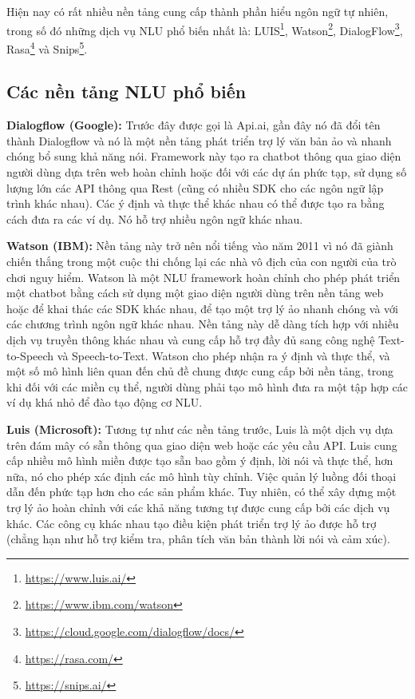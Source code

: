 Hiện nay có rất nhiều nền tảng cung cấp thành phần hiểu ngôn ngữ tự nhiên, trong số đó những dịch vụ NLU phổ biến nhất là: LUIS\footnote{\url{https://www.luis.ai/}}, Watson\footnote{\url{https://www.ibm.com/watson}}, DialogFlow\footnote{\url{https://cloud.google.com/dialogflow/docs/}}, Rasa\footnote{\url{https://rasa.com/}} và Snips\footnote{\url{https://snips.ai/}}.

\subsection{Các nền tảng NLU phổ biến}

\textbf{Dialogflow (Google):} Trước đây được gọi là Api.ai, gần đây nó đã đổi tên thành Dialogflow và nó là một nền tảng phát triển trợ lý văn bản ảo và nhanh chóng bổ sung khả năng nói. Framework này tạo ra chatbot thông qua giao diện người dùng dựa trên web hoàn chỉnh hoặc đối với các dự án phức tạp, sử dụng số lượng lớn các API thông qua Rest (cũng có nhiều SDK cho các ngôn ngữ lập trình khác nhau). Các ý định và thực thể khác nhau có thể được tạo ra bằng cách đưa ra các ví dụ. Nó hỗ trợ nhiều ngôn ngữ khác nhau.

\textbf{Watson (IBM):} Nền tảng này trở nên nổi tiếng vào năm 2011 vì nó đã giành chiến thắng trong một cuộc thi chống lại các nhà vô địch của con người của trò chơi nguy hiểm. Watson là một NLU framework hoàn chỉnh cho phép phát triển một chatbot bằng cách sử dụng một giao diện người dùng trên nền tảng web hoặc để khai thác các SDK khác nhau, để tạo một trợ lý ảo nhanh chóng và với các chương trình ngôn ngữ khác nhau. Nền tảng này dễ dàng tích hợp với nhiều dịch vụ truyền thông khác nhau và cung cấp hỗ trợ đầy đủ sang công nghệ Text-to-Speech và Speech-to-Text. Watson cho phép nhận ra ý định và thực thể, và một số mô hình liên quan đến chủ đề chung được cung cấp bởi nền tảng, trong khi đối với các miền cụ thể, người dùng phải tạo mô hình đưa ra một tập hợp các ví dụ khá nhỏ để đào tạo động cơ NLU.

\textbf{Luis (Microsoft):} Tương tự như các nền tảng trước, Luis là một dịch vụ dựa trên đám mây có sẵn thông qua giao diện web hoặc các yêu cầu API. Luis cung cấp nhiều mô hình miền được tạo sẵn bao gồm ý định, lời nói và thực thể, hơn nữa, nó cho phép xác định các mô hình tùy chỉnh. Việc quản lý luồng đối thoại dẫn đến phức tạp hơn cho các sản phẩm khác. Tuy nhiên, có thể xây dựng một trợ lý ảo hoàn chỉnh với các khả năng tương tự được cung cấp bởi các dịch vụ khác. Các công cụ khác nhau tạo điều kiện phát triển trợ lý ảo được hỗ trợ (chẳng hạn như hỗ trợ kiểm tra, phân tích văn bản thành lời nói và cảm xúc).

